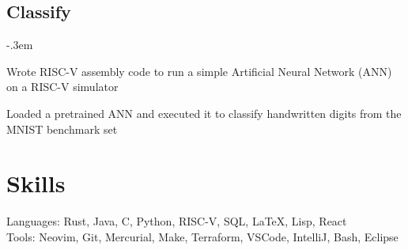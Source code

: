 \documentclass{article}
\let\olditemize=\itemize \let\endolditemize=\enditemize
\renewenvironment{itemize}{\olditemize[topsep=0em] \itemsep-.3em}{\endolditemize}
\begin{document}
\subsection{Classify}
\begin{itemize}
  \item Wrote RISC-V assembly code to run a simple Artificial Neural Network (ANN) on a RISC-V simulator
  \item Loaded a pretrained ANN and executed it to classify handwritten digits from the MNIST benchmark set
\end{itemize}




\section{Skills}
Languages:
  Rust, Java, C, Python, RISC-V, SQL, LaTeX, Lisp, React\\
Tools:
  Neovim, Git, Mercurial, Make, Terraform, VSCode, IntelliJ, Bash, Eclipse\\
\end{document}
